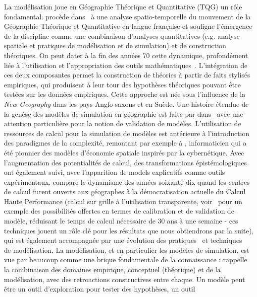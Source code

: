 {}{
La modélisation joue en Géographie Théorique et Quantitative (TQG) un rôle fondamental.
  procède dans~\cite{cuyala2014analyse} à une analyse spatio-temporelle du mouvement de la Géographie Théorique et Quantitative en langue française et souligne l'émergence de la discipline comme une combinaison d'analyses quantitatives (e.g. analyse spatiale et pratiques de modélisation et de simulation) et de construction théoriques. On peut dater à la fin des années 70 cette dynamique, profondément liée à l'utilisation et l'appropriation des outils mathématiques~\cite{pumain2002role}. L'intégration de ces deux composantes permet la construction de théories à partir de faits stylisés empiriques, qui produisent à leur tour des hypothèses théoriques pouvant être testées sur les données empiriques. Cette approche est née sous l'influence de la \emph{New Geography} dans les pays Anglo-saxons et en Suède. Une histoire étendue de la genèse des modèles de simulation en géographie est faite par  dans~\cite{rey2015plateforme} avec une attention particulière pour la notion de validation de modèles. L'utilisation de ressources de calcul pour la simulation de modèles est antérieure à l'introduction des paradigmes de la complexité, remontant par exemple à , informaticien qui a été pionnier des modèles d'économie spatiale inspirés par la cybernétique. Avec l'augmentation des potentialités de calcul, des transformations épistémologiques ont également suivi, avec l'apparition de models explicatifs comme outils expérimentaux.  compare le dynamisme des années soixante-dix quand les centres de calcul furent ouverts aux géographes à la démocratisation actuelle du Calcul Haute Performance (calcul sur grille à l'utilisation transparente, voir~\cite{schmitt2014half} pour un exemple des possibilités offertes en termes de calibration et de validation de modèle, réduisant le temps de calcul nécessaire de 30 ans à une semaine - ces techniques jouent un rôle clé pour les résultats que nous obtiendrons par la suite), qui est également accompagnée par une évolution des pratiques~\cite{banos2013pour} et techniques~\cite{10.1371/journal.pone.0138212} de modélisation. La modélisation, et en particulier les modèles de simulation, est vue par beaucoup comme une brique fondamentale de la connaissance : \cite{livet2010} rappelle la combinaison des domaines empirique, conceptuel (théorique) et de la modélisation, avec des retroactions constructives entre chaque. Un modèle peut être un outil d'exploration pour tester des hypothèses, un outil }
